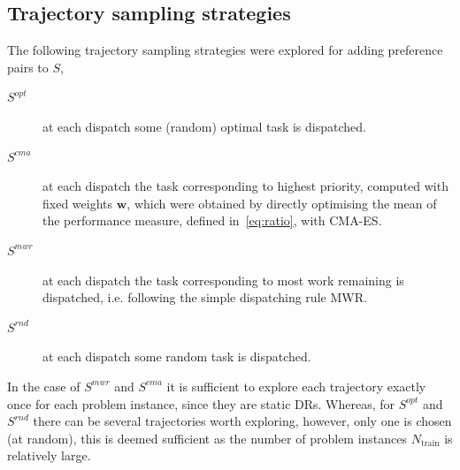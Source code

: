 \documentclass[letterpaper]{article}
\renewcommand{\vec}[1]{\mathbf{#1}}
\begin{document}

\subsection{Trajectory sampling strategies}\label{sec:tracks}
The following trajectory sampling strategies were explored for adding preference pairs to $S$,
\begin{description}
\item[$S^{opt}$] at each dispatch some (random) optimal task is dispatched.
\item[$S^{cma}$] at each dispatch the task corresponding to highest priority, computed with fixed weights $\vec{w}$, which were obtained by directly optimising the mean of the performance measure, defined in~\cref{eq:ratio}, with CMA-ES. 
\item[$S^{mwr}$] at each dispatch the task corresponding to most work remaining is dispatched, i.e. following the simple dispatching rule MWR.
\item[$S^{rnd}$] at each dispatch some random task is dispatched.
\end{description}
In the case of $S^{mwr}$ and $S^{cma}$ it is sufficient to explore each trajectory exactly once for each problem instance, since they are static DRs. Whereas, for $S^{opt}$ and $S^{rnd}$ there can be several trajectories worth exploring, however, only one is chosen (at random), this is deemed sufficient as the number of problem instances $N_{\text{train}}$ is relatively large.
\end{document}
